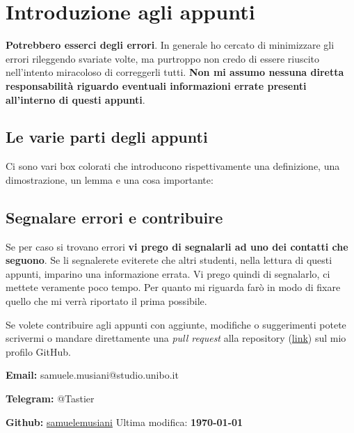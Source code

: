 \section{Introduzione agli appunti}

\textbf{Potrebbero esserci degli errori}. In generale ho cercato di minimizzare 
gli errori rileggendo svariate volte, ma purtroppo non credo di essere riuscito 
nell'intento miracoloso di correggerli tutti. \textbf{Non mi assumo nessuna 
diretta responsabilità riguardo eventuali informazioni errate presenti 
all'interno di questi appunti}.

\subsection{Le varie parti degli appunti}
Ci sono vari box colorati che introducono rispettivamente una definizione, una 
dimostrazione, un lemma e una cosa importante:






\subsection{Segnalare errori e contribuire}
Se per caso si trovano errori \textbf{vi prego di segnalarli ad uno dei 
contatti che seguono}. Se li segnalerete eviterete che altri studenti, nella 
lettura di questi appunti, imparino una informazione errata. Vi prego quindi di 
segnalarlo, ci mettete veramente poco tempo. Per quanto mi riguarda farò in 
modo di fixare quello che mi verrà riportato il prima possibile.\bigbreak

Se volete contribuire agli appunti con aggiunte, modifiche o suggerimenti 
potete scrivermi o mandare direttamente una \textit{pull request} alla 
repository (\href{https://github.com/samuelemusiani/Analisi}{link}) sul mio 
profilo GitHub.\bigbreak


\textbf{Email:} samuele.musiani@studio.unibo.it\bigbreak

\textbf{Telegram:} @Tastier\bigbreak

\textbf{Github:} \href{https://github.com/samuelemusiani}{samuelemusiani}
\vfill\hfill Ultima modifica: \textbf{\today}
